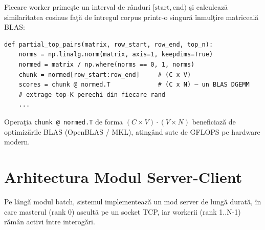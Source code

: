\documentclass[a4paper,12pt]{report}
\begin{document}
Fiecare worker prime\c{s}te un interval de r\^{a}nduri $[\text{start}, \text{end})$ \c{s}i calculeaz\u{a} similaritatea cosinus fa\c{t}\u{a} de \^{i}ntregul corpus printr-o singur\u{a} \^{i}nmul\c{t}ire matriceal\u{a} \ac{BLAS}:

\begin{lstlisting}[caption={Calculul cosinus vectorizat pe worker}]
def partial_top_pairs(matrix, row_start, row_end, top_n):
    norms = np.linalg.norm(matrix, axis=1, keepdims=True)
    normed = matrix / np.where(norms == 0, 1, norms)
    chunk = normed[row_start:row_end]     # (C x V)
    scores = chunk @ normed.T             # (C x N) — un BLAS DGEMM
    # extrage top-K perechi din fiecare rand
    ...
\end{lstlisting}

Opera\c{t}ia \texttt{chunk @ normed.T} de forma $(C \times V) \cdot (V \times N)$ beneficiaz\u{a} de optimiz\u{a}rile BLAS (OpenBLAS / MKL), ating\^{a}nd sute de GFLOPS pe hardware modern.

\section{Arhitectura Modul Server-Client}

Pe l\^{a}ng\u{a} modul batch, sistemul implementeaz\u{a} un mod server de lung\u{a} durat\u{a}, \^{i}n care masterul (rank 0) ascult\u{a} pe un socket TCP, iar workerii (rank 1..N-1) r\u{a}m\^{a}n activi \^{i}ntre interog\u{a}ri.
\end{document}
